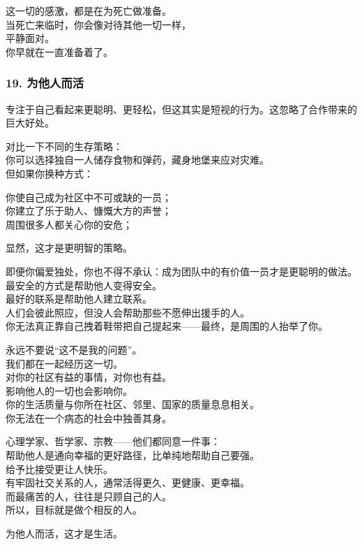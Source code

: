 \documentclass[
]{article}
\begin{document}
这一切的感激，都是在为死亡做准备。\\
当死亡来临时，你会像对待其他一切一样，\\
平静面对。\\
你早就在一直准备着了。

\subsubsection{19. 为他人而活}\label{19-ux4e3aux4ed6ux4ebaux800cux6d3b}

专注于自己看起来更聪明、更轻松，但这其实是短视的行为。这忽略了合作带来的巨大好处。

对比一下不同的生存策略：\\
你可以选择独自一人储存食物和弹药，藏身地堡来应对灾难。\\
但如果你换种方式：

你使自己成为社区中不可或缺的一员；\\
你建立了乐于助人、慷慨大方的声誉；\\
周围很多人都关心你的安危；

显然，这才是更明智的策略。

即便你偏爱独处，你也不得不承认：成为团队中的有价值一员才是更聪明的做法。\\
最安全的方式是帮助他人变得安全。\\
最好的联系是帮助他人建立联系。\\
人们会彼此照应，但没人会帮助那些不愿伸出援手的人。\\
你无法真正靠自己拽着鞋带把自己提起来------最终，是周围的人抬举了你。

永远不要说``这不是我的问题''。\\
我们都在一起经历这一切。\\
对你的社区有益的事情，对你也有益。\\
影响他人的一切也会影响你。\\
你的生活质量与你所在社区、邻里、国家的质量息息相关。\\
你无法在一个病态的社会中独善其身。

心理学家、哲学家、宗教------他们都同意一件事：\\
帮助他人是通向幸福的更好路径，比单纯地帮助自己要强。\\
给予比接受更让人快乐。\\
有牢固社交关系的人，通常活得更久、更健康、更幸福。\\
而最痛苦的人，往往是只顾自己的人。\\
所以，目标就是做个相反的人。

为他人而活，这才是生活。
\end{document}
